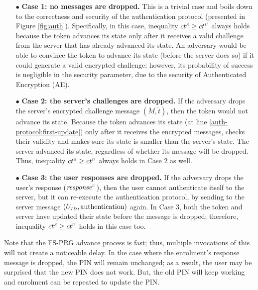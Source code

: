 \begin{itemize}[leftmargin=5.5mm]
%
\item[$\bullet$] \textbf{Case 1: no messages are dropped.} This is a trivial case and boils down to the correctness and security of the authentication protocol  (presented in Figure \ref{fig:auth}). Specifically, in this case, inequality  ${ct}^{\scriptscriptstyle S} \geq {ct}^{\scriptscriptstyle U}$ always holds because the token advances its state only after it receives a valid challenge from the server that has already advanced its state. An adversary would be able to convince the token to advance its state (before the server does so) if it could generate a valid encrypted challenge; however, its probability of success is negligible in the security parameter, due to the security of Authenticated Encryption (AE). 
%
\item[$\bullet$] \textbf{Case 2: the server's challenges are dropped.} If the adversary drops the server's encrypted challenge message $(\ddot M, \ddot t)$, then the token would not advance its state. Because the token advances its state (at line \ref{auth-protocol:first-update}) only after it receives the encrypted messages, checks their validity and makes sure its state is smaller than the server's state. The server advanced its state, regardless of whether its message will be dropped. Thus, inequality  ${ct}^{\scriptscriptstyle S} \geq {ct}^{\scriptscriptstyle U}$ always holds in Case 2 as well. 
%
\item[$\bullet$] \textbf{Case 3: the user responses are dropped.} If the adversary drops the user's response (\ie $\mathit{response}^{\scriptscriptstyle U}$), then the user cannot authenticate itself to the server, but it can re-execute the authentication protocol, by sending to the server message $(U_{\scriptscriptstyle ID}, \text{authentication})$ again. In Case 3, both the token and server have updated their state before the message is dropped; therefore, inequality ${ct}^{\scriptscriptstyle S} \geq {ct}^{\scriptscriptstyle U}$  holds in this case too.   
%
\end{itemize}







Note that 
the FS-PRG advance process is fast; thus,  multiple invocations of this will not create a noticeable delay.
%
In the case where the enrolment's response message is dropped, the PIN will remain unchanged; as a result,  the user may be surprised that the new PIN does not work. But, the old PIN will keep working and enrolment can be repeated to update the PIN.
